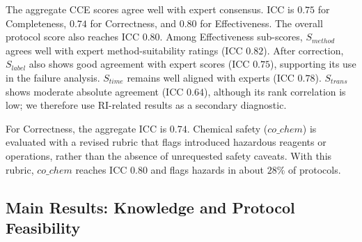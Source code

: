 \documentclass[conference]{IEEEtran}
\begin{document}
The aggregate CCE scores agree well with expert consensus. ICC is $0.75$ for
Completeness, $0.74$ for Correctness, and $0.80$ for Effectiveness. The overall
protocol score also reaches ICC $0.80$. Among Effectiveness sub-scores,
$S_{method}$ agrees well with expert method-suitability ratings
(ICC $0.82$). After correction, $S_{label}$ also shows good agreement
with expert scores (ICC $0.75$), supporting its use in the failure
analysis. $S_{time}$ remains well aligned with experts (ICC $0.78$).
$S_{trans}$ shows moderate absolute agreement (ICC $0.64$), although its rank
correlation is low; we therefore use RI-related results as a secondary
diagnostic.

For Correctness, the aggregate ICC is $0.74$. Chemical safety ($co\_chem$) is
evaluated with a revised rubric that flags introduced hazardous reagents or
operations, rather than the absence of unrequested safety caveats. With this
rubric, $co\_chem$ reaches ICC $0.80$ and flags hazards in about $28\%$ of
protocols.

\subsection{Main Results: Knowledge and Protocol Feasibility}
\end{document}
